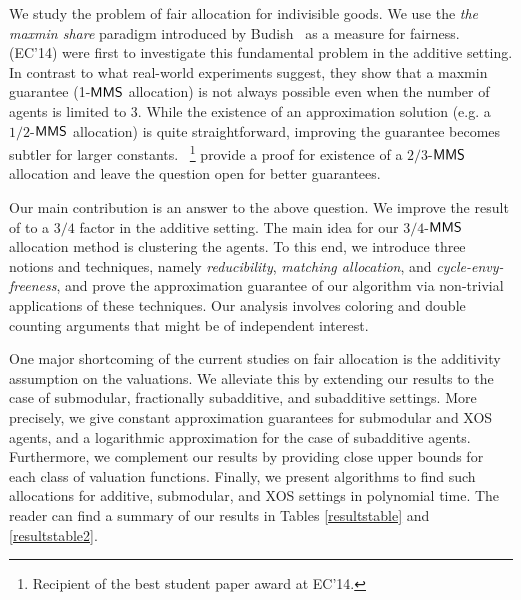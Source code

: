 We study the problem of fair allocation for indivisible goods. We use the \textit{the maxmin share} paradigm introduced by Budish~\cite{Budish:first} as a measure for fairness. \procacciafirst ~\cite{Procaccia:first} (EC'14) were first to investigate this fundamental problem in the additive setting. In contrast to what real-world experiments suggest, they show that a maxmin guarantee (1-$\mathsf{MMS}$ allocation) is not always possible even when the number of agents is limited to 3. While the existence of an approximation solution (e.g. a $1/2$-$\mathsf{MMS}$ allocation) is quite straightforward, improving the guarantee becomes subtler for larger constants.
\procacciafirst ~\cite{Procaccia:first}\footnote{Recipient of the best student paper award at EC'14.} provide a proof for existence of a $2/3$-$\mathsf{MMS}$ allocation and leave the question open for better guarantees.

Our main contribution is an answer to the above question. We improve the result of \procacciafirst\! to a $3/4$
 factor in the additive setting. The main idea for our $3/4$-$\mathsf{MMS}$ allocation method is clustering the agents. To this end, we introduce three notions and techniques, namely \textit{reducibility}, \textit{matching allocation}, and \textit{cycle-envy-freeness}, and prove the approximation guarantee of our algorithm via non-trivial applications of these techniques. Our analysis involves coloring and double counting arguments that might be of independent interest.

One major shortcoming of the current studies on fair allocation is the additivity assumption on the valuations. We alleviate this by extending our results to the case of submodular, fractionally subadditive, and subadditive settings. More precisely, we give constant approximation guarantees for submodular and XOS agents, and a logarithmic approximation for the case of subadditive agents. Furthermore, we complement our results by providing close upper bounds for each class of valuation functions. Finally, we present algorithms to find such allocations for additive, submodular, and XOS settings in polynomial time. The reader can find a summary of our results in Tables \ref{resultstable} and \ref{resultstable2}. 
